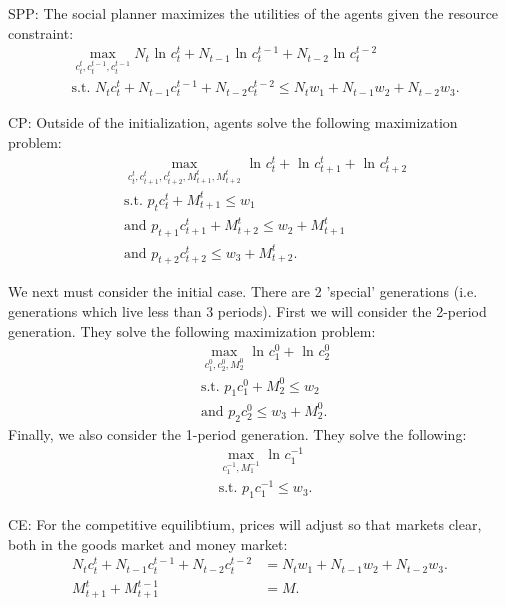 \documentclass[11pt]{article} %
\begin{document}
SPP: The social planner maximizes the utilities of the agents given the resource constraint: 
\begin{align*}
&\max_{c_t^{t},c_{t}^{t-1},c_{t}^{t-1}} N_{t}\text{ ln } c_{t}^{t} + N_{t-1}\text{ ln } c_{t}^{t-1} + N_{t-2}\text{ ln } c_{t}^{t-2}\\
&\text{s.t. }  N_{t}c_{t}^{t} +  N_{t-1}c_{t}^{t-1} + N_{t-2}c_{t}^{t-2}\leq N_{t}w_1 + N_{t-1}w_2 + N_{t-2}w_3.
\end{align*}


CP: Outside of the initialization, agents solve the following maximization problem:
\begin{align*}
&\max_{c_t^{t},c_{t+1}^{t},c_{t+2}^{t},M_{t+1}^{t},M_{t+2}^{t}} \text{ ln } c_{t}^{t} + \text{ ln } c_{t+1}^{t}+ \text{ ln } c_{t+2}^{t}\\
&\text{s.t. }  p_t c_{t}^{t} + M_{t+1}^t \leq w_1 \\
& \text{and } p_{t+1} c_{t+1}^t  + M_{t+2}^t \leq  w_2 + M_{t+1}^t \\
& \text{and } p_{t+2} c_{t+2}^t \leq w_3 + M_{t+2}^t.
\end{align*}

We next must consider the initial case. There are 2 'special' generations (i.e. generations which live less than 3 periods). First we will consider the 2-period generation. They solve the following maximization problem:
\begin{align*}
&\max_{c_{1}^{0},c_{2}^{0},M_{2}^{0}}  \text{ ln } c_{1}^{0}+ \text{ ln } c_{2}^{0}\\
& \text{s.t. } p_{1} c_{1}^0  + M_{2}^0 \leq  w_2 \\
& \text{and } p_{2} c_{2}^0 \leq w_3 + M_{2}^0.
\end{align*}
Finally, we also consider the 1-period generation. They solve the following:
\begin{align*}
&\max_{c_{1}^{-1},M_{1}^{-1}}  \text{ ln } c_{1}^{-1}\\
& \text{s.t. } p_{1} c_{1}^{-1} \leq w_3.
\end{align*}

CE: For the competitive equilibtium, prices will adjust so that markets clear, both in the goods market and money market:
\begin{align*}
N_{t}c_{t}^{t} +  N_{t-1}c_{t}^{t-1} + N_{t-2}c_{t}^{t-2} &= N_{t}w_1 + N_{t-1}w_2 + N_{t-2}w_3.\\
M_{t+1}^{t} + M_{t+1}^{t-1} &= M.
\end{align*}
\end{document}
